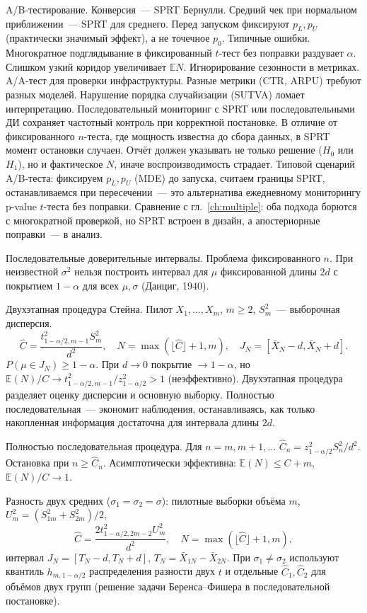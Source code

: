 A/B-тестирование. Конверсия~--- SPRT Бернулли. Средний чек при нормальном приближении~--- SPRT для среднего.
Перед запуском фиксируют $p_L,p_U$ (практически значимый эффект), а не точечное $p_0$.
Типичные ошибки. Многократное подглядывание в фиксированный $t$-тест без поправки раздувает $\alpha$. Слишком узкий коридор увеличивает $\mathbb{E}N$. Игнорирование сезонности в метриках. A/A-тест для проверки инфраструктуры. Разные метрики (CTR, ARPU) требуют разных моделей. Нарушение порядка случайизации (SUTVA) ломает интерпретацию.
Последовательный мониторинг с SPRT или последовательными ДИ сохраняет частотный контроль при корректной постановке.
В отличие от фиксированного $n$-теста, где мощность известна до сбора данных, в SPRT момент остановки случаен. Отчёт должен указывать не только решение ($H_0$ или $H_1$), но и фактическое $N$, иначе воспроизводимость страдает. Типовой сценарий A/B-теста: фиксируем $p_L,p_U$ (MDE) до запуска, считаем границы SPRT, останавливаемся при пересечении~--- это альтернатива ежедневному мониторингу p-value $t$-теста без поправки.
Сравнение с гл.~\ref{ch:multiple}: оба подхода борются с многократной проверкой, но SPRT встроен в дизайн, а апостериорные поправки~--- в анализ.

Последовательные доверительные интервалы. Проблема фиксированного $n$. При неизвестной $\sigma^2$ нельзя построить интервал для $\mu$ фиксированной длины $2d$ с покрытием $1-\alpha$ для всех $\mu,\sigma$ (Данциг, 1940).

Двухэтапная процедура Стейна. Пилот $X_1,\ldots,X_m$, $m\ge 2$, $S_m^2$~--- выборочная дисперсия.
\[ \hat C=\frac{t_{1-\alpha/2,m-1}^2 S_m^2}{d^2},\quad N=\max(\lfloor\hat C\rfloor+1,m),\quad J_N=[\bar X_N-d,\bar X_N+d].
\] $P(\mu\in J_N)\ge 1-\alpha$. При $d\to 0$ покрытие $\to 1-\alpha$, но $\mathbb{E}(N)/C\to t_{1-\alpha/2,m-1}^2/z_{1-\alpha/2}^2>1$ (неэффективно).
Двухэтапная процедура разделяет оценку дисперсии и основную выборку. Полностью последовательная~--- экономит наблюдения, останавливаясь, как только накопленная информация достаточна для интервала длины $2d$.

Полностью последовательная процедура. Для $n=m,m+1,\ldots$ $\hat C_n=z_{1-\alpha/2}^2 S_n^2/d^2$. Остановка при $n\ge\hat C_n$.
Асимптотически эффективна: $\mathbb{E}(N)\le C+m$, $\mathbb{E}(N)/C\to 1$.

Разность двух средних ($\sigma_1=\sigma_2=\sigma$): пилотные выборки объёма $m$, $U_m^2=(S_{1m}^2+S_{2m}^2)/2$, \[ \hat C=\frac{2t_{1-\alpha/2,2m-2}^2 U_m^2}{d^2},\quad N=\max(\lfloor\hat C\rfloor+1,m), \] интервал $J_N=[T_N-d,T_N+d]$, $T_N=\bar X_{1N}-\bar X_{2N}$.
При $\sigma_1\neq\sigma_2$ используют квантиль $h_{m,1-\alpha/2}$ распределения разности двух $t$ и отдельные $\hat C_1,\hat C_2$ для объёмов двух групп (решение задачи Беренса--Фишера в последовательной постановке).

